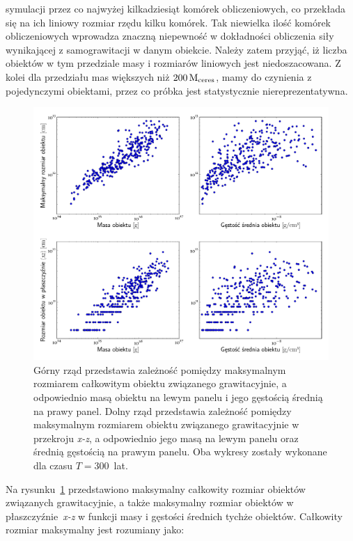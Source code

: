 symulacji przez co najwyżej kilkadziesiąt komórek obliczeniowych, co przekłada
się na ich liniowy rozmiar rzędu kilku komórek. Tak niewielka ilość komórek
obliczeniowych wprowadza znaczną niepewność w dokładności obliczenia
siły wynikającej z samograwitacji w danym obiekcie. Należy zatem przyjąć, iż
liczba obiektów w tym przedziale masy i rozmiarów liniowych jest 
niedoszacowana. Z kolei dla przedziału mas większych niż $200\hbox{$\mathrm{\thinspace M_{\textrm{ceres}}}$}$, mamy
do czynienia z pojedynczymi obiektami, przez co próbka jest statystycznie
niereprezentatywna.
%
\begin{figure}[ht]
   \centering
   \includegraphics[width=0.99\linewidth]{figures/fig_mass_size}
   \caption{Górny rząd przedstawia zależność pomiędzy maksymalnym rozmiarem
      całkowitym obiektu związanego grawitacyjnie, a odpowiednio masą obiektu na
      lewym panelu i jego gęstością średnią na prawy panel. Dolny rząd
      przedstawia zależność pomiędzy maksymalnym rozmiarem obiektu związanego
   grawitacyjnie w przekroju \emph{x-z}, a odpowiednio jego masą na lewym panelu
oraz średnią gęstością na prawym panelu. Oba  wykresy zostały wykonane dla czasu
$T=300$~lat. }
   \label{fig:mass_size}
\end{figure}
%
\par Na rysunku~\ref{fig:mass_size} przedstawiono maksymalny całkowity rozmiar
obiektów związanych grawitacyjnie, a także maksymalny rozmiar obiektów w
płaszczyźnie~\emph{x-z} w funkcji masy i gęstości średnich tychże obiektów.
Całkowity rozmiar maksymalny jest rozumiany jako:
